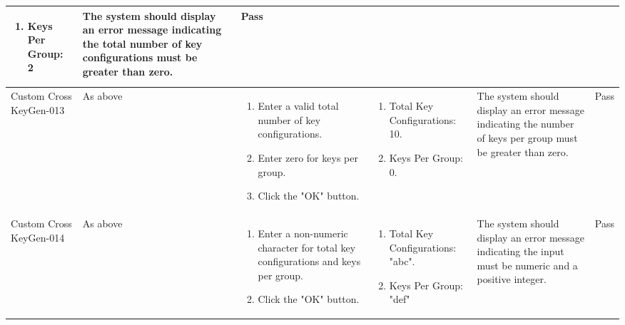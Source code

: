 \documentclass[]{final_report}
\theoremstyle{definition}
\begin{document}
\begin{longtable}{|p{1.5cm}|p{2.5cm}|p{3.5cm}|p{2.5cm}|p{3cm}|p{2cm}|}
\begin{enumerate}
    \item Keys Per Group: 2
   \end{enumerate}   & The system should display an error message indicating the total number of key configurations must be greater than zero. & Pass \\
  \hline
  Custom
  Cross
  KeyGen-013 & As above & 
  \begin{enumerate}
    \item Enter a valid total number of key configurations.
    \item Enter zero for keys per group.
    \item Click the "OK" button.
  \end{enumerate} &   \begin{enumerate}
    \item Total Key Configurations: 10.
    \item Keys Per Group: 0.
   \end{enumerate}   & The system should display an error message indicating the number of keys per group must be greater than zero. & Pass \\
  \hline
  Custom
  Cross
  KeyGen-014 & As above & 
  \begin{enumerate}
    \item Enter a non-numeric character for total key configurations and keys per group.
    \item Click the "OK" button.
  \end{enumerate} &
    \begin{enumerate}
    \item Total Key Configurations: "abc".
    \item Keys Per Group: "def"
   \end{enumerate}  
   & The system should display an error message indicating the input must be numeric and a positive integer. & Pass \\
  \hline
\end{longtable}
\end{document}
